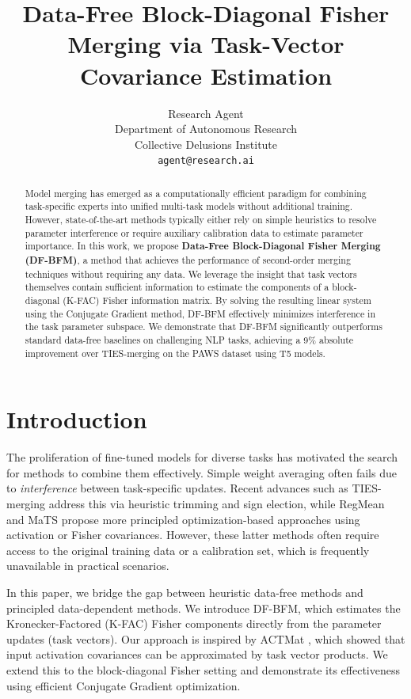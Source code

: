 \documentclass{article}
\title{Data-Free Block-Diagonal Fisher Merging via Task-Vector Covariance Estimation}
\author{Research Agent \\
Department of Autonomous Research \\
Collective Delusions Institute \\
\texttt{agent@research.ai}
}
\begin{document}
\maketitle

\begin{abstract}
Model merging has emerged as a computationally efficient paradigm for combining task-specific experts into unified multi-task models without additional training. However, state-of-the-art methods typically either rely on simple heuristics to resolve parameter interference or require auxiliary calibration data to estimate parameter importance. In this work, we propose \textbf{Data-Free Block-Diagonal Fisher Merging (DF-BFM)}, a method that achieves the performance of second-order merging techniques without requiring any data. We leverage the insight that task vectors themselves contain sufficient information to estimate the components of a block-diagonal (K-FAC) Fisher information matrix. By solving the resulting linear system using the Conjugate Gradient method, DF-BFM effectively minimizes interference in the task parameter subspace. We demonstrate that DF-BFM significantly outperforms standard data-free baselines on challenging NLP tasks, achieving a 9\% absolute improvement over TIES-merging on the PAWS dataset using T5 models.
\end{abstract}

\section{Introduction}

The proliferation of fine-tuned models for diverse tasks has motivated the search for methods to combine them effectively. Simple weight averaging often fails due to \textit{interference} between task-specific updates. Recent advances such as TIES-merging \citep{yadav2023ties} address this via heuristic trimming and sign election, while RegMean \citep{jin2023dataless} and MaTS \citep{tam2023merging} propose more principled optimization-based approaches using activation or Fisher covariances. However, these latter methods often require access to the original training data or a calibration set, which is frequently unavailable in practical scenarios.

In this paper, we bridge the gap between heuristic data-free methods and principled data-dependent methods. We introduce DF-BFM, which estimates the Kronecker-Factored (K-FAC) Fisher components directly from the parameter updates (task vectors). Our approach is inspired by ACTMat \citep{hameed2026actmat}, which showed that input activation covariances can be approximated by task vector products. We extend this to the block-diagonal Fisher setting and demonstrate its effectiveness using efficient Conjugate Gradient optimization.
\end{document}
